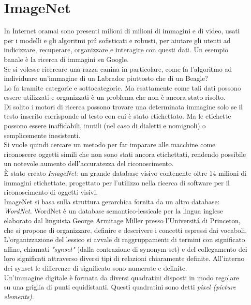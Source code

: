 \documentclass[a4paper,12pt,oneside]{book}
\begin{document}
\section{ImageNet}\label{ImageNet}
In Internet oramai sono presenti milioni di milioni di immagini e di video, usati per i modelli e gli algoritmi pi\'{u} sofisticati e robusti, per aiutare gli utenti ad indicizzare, recuperare, organizzare e interagire con questi dati.
Un esempio banale \`e la ricerca di immagini su Google.\\
Se si volesse ricercare una razza canina in particolare, come fa l'algoritmo ad individuare un'immagine di un Labrador piuttosto che di un Beagle?\\
Lo fa tramite categorie e sottocategorie. Ma esattamente come tali dati possono essere utilizzati e organizzati \`e un problema che non \`e ancora stato risolto.\\
Di solito i motori di ricerca possono trovare una determinata immagine solo se il testo inserito corrisponde al testo con cui \`e stato etichettato. Ma le etichette possono essere inaffidabili, inutili (nel caso di dialetti e nomignoli) o semplicemente inesistenti.\\
Si vuole quindi cercare un metodo per far imparare alle macchine come riconoscere oggetti simili che non sono stati ancora etichettati, rendendo possibile un notevole aumento dell'accuratezza del riconoscimento.\\
\`{E} stato creato \textit{ImageNet}: un grande database visivo contenente oltre 14 milioni di immagini etichettate, progettato per l'utilizzo nella ricerca di software per il riconoscimento di oggetti visivi.\\
ImageNet si basa sulla struttura gerarchica fornita da un altro database: \textit{WordNet}. WordNet \`e un database semantico-lessicale per la lingua inglese elaborato dal linguista George Armitage Miller presso l'Universit\'{a} di Princeton, che si propone di organizzare, definire e descrivere i concetti espressi dai vocaboli. L'organizzazione del lessico si avvale di raggruppamenti di termini con significato affine, chiamati \textit{"synset"} (dalla contrazione di synonym set) e del collegamento dei loro significati attraverso diversi tipi di relazioni chiaramente definite. All'interno dei synset le differenze di significato sono numerate e definite.\cite{wordnet}\\
Un'immagine digitale \`e formata da diversi quadratini disposti in modo regolare su una griglia di punti equidistanti. Questi quadratini sono detti \textit{pixel (picture elements)}.\\
\end{document}
